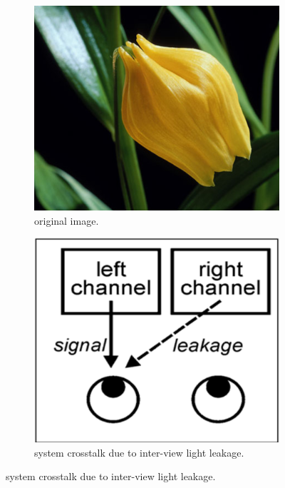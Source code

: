 \begin{figure}[htbp]
    \centering

    \begin{subfigure}[t]{0.3\textwidth}
        \includegraphics[width=\textwidth]{./Template_Figures/orig}
        \caption{original image.}\label{fig:originalPicture}
    \end{subfigure}
    \begin{subfigure}[t]{0.3\textwidth}
        \includegraphics[width=\textwidth]{./Template_Figures/leakage}
        \caption{system crosstalk due to inter-view light leakage.}\label{fig:ill_leackage}
    \end{subfigure}


\end{figure}
